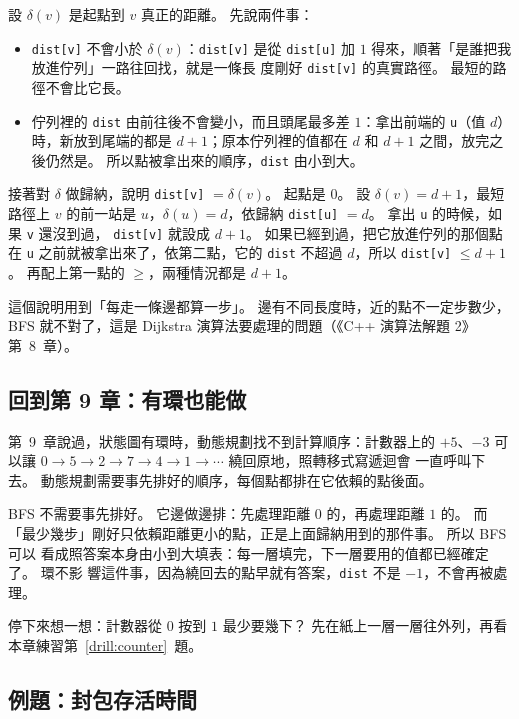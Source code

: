\begin{whybox}
設 $\delta(v)$ 是起點到 $v$ 真正的距離。 先說兩件事：

\begin{itemize}
\item \texttt{dist[v]} 不會小於 $\delta(v)$：\texttt{dist[v]} 是從
\texttt{dist[u]} 加 $1$ 得來，順著「是誰把我放進佇列」一路往回找，就是一條長
度剛好 \texttt{dist[v]} 的真實路徑。 最短的路徑不會比它長。
\item 佇列裡的 \texttt{dist} 由前往後不會變小，而且頭尾最多差 $1$：拿出前端的
\texttt{u}（值 $d$）時，新放到尾端的都是 $d + 1$；原本佇列裡的值都在 $d$ 和
$d + 1$ 之間，放完之後仍然是。 所以點被拿出來的順序，\texttt{dist} 由小到大。
\end{itemize}

接著對 $\delta$ 做歸納，說明 \texttt{dist[v]} $= \delta(v)$。 起點是 $0$。 設
$\delta(v) = d + 1$，最短路徑上 $v$ 的前一站是 $u$，$\delta(u) = d$，依歸納
\texttt{dist[u]} $= d$。 拿出 \texttt{u} 的時候，如果 \texttt{v} 還沒到過，
\texttt{dist[v]} 就設成 $d + 1$。 如果已經到過，把它放進佇列的那個點在
\texttt{u} 之前就被拿出來了，依第二點，它的 \texttt{dist} 不超過 $d$，所以
\texttt{dist[v]} $\le d + 1$。 再配上第一點的 $\ge$，兩種情況都是 $d + 1$。
\end{whybox}

這個說明用到「每走一條邊都算一步」。 邊有不同長度時，近的點不一定步數少，BFS
就不對了，這是 Dijkstra 演算法要處理的問題（《C++ 演算法解題 2》第~8~章）。

\subsection{回到第 9 章：有環也能做}

第~9~章說過，狀態圖有環時，動態規劃找不到計算順序：計數器上的 $+5$、$-3$ 可
以讓 $0 \to 5 \to 2 \to 7 \to 4 \to 1 \to \cdots$ 繞回原地，照轉移式寫遞迴會
一直呼叫下去。 動態規劃需要事先排好的順序，每個點都排在它依賴的點後面。

BFS 不需要事先排好。 它邊做邊排：先處理距離 $0$ 的，再處理距離 $1$ 的。 而
「最少幾步」剛好只依賴距離更小的點，正是上面歸納用到的那件事。 所以 BFS 可以
看成照答案本身由小到大填表：每一層填完，下一層要用的值都已經確定了。 環不影
響這件事，因為繞回去的點早就有答案，\texttt{dist} 不是 $-1$，不會再被處理。

停下來想一想：計數器從 $0$ 按到 $1$ 最少要幾下？ 先在紙上一層一層往外列，再看
本章練習第~\ref{drill:counter}~題。

\subsection{例題：封包存活時間}
\label{sec:ex-ttl}


